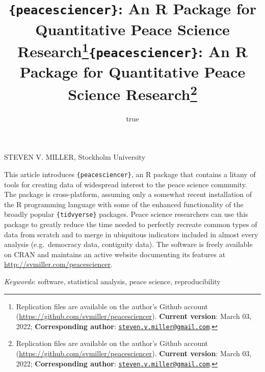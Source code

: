 \documentclass[
  11pt,
]{article}
\title{\texttt{\{peacesciencer\}}: An R Package for Quantitative Peace Science Research\thanks{Replication files are available on the author's Github account (\url{https://github.com/svmiller/peacesciencer}). \textbf{Current version}: March 03, 2022; \textbf{Corresponding author}: \href{mailto:steven.v.miller@gmail.com}{\nolinkurl{steven.v.miller@gmail.com}}.}}
\author{true}
\date{}
\title{\texttt{\{peacesciencer\}}: An R Package for Quantitative Peace Science Research\thanks{Replication files are available on the author's Github account (\url{https://github.com/svmiller/peacesciencer}). \textbf{Current version}: March 03, 2022; \textbf{Corresponding author}: \href{mailto:steven.v.miller@gmail.com}{\nolinkurl{steven.v.miller@gmail.com}}.}  }
\date{}
\renewenvironment{abstract}
 {{%
    \setlength{\leftmargin}{0mm}
    \setlength{\rightmargin}{\leftmargin}%
  }%
  \relax}
 {\endlist}
\begin{document}



{%
\setlength{\parindent}{0pt}
\thispagestyle{plain}
{%
\maketitle  %

}




{
   \vskip 13.5pt\relax \normalsize\fontsize{11}{12}
   \MakeUppercase{Steven V. Miller}, \small{Stockholm University}   

}

}








\begin{abstract}


    \vskip 8.5pt %

\noindent \small{This article introduces \texttt{\{peacesciencer\}}, an R package that contains a litany of tools for creating data of widespread interest to the peace science community. The package is cross-platform, assuming only a somewhat recent installation of the R programming language with some of the enhanced functionality of the broadly popular \texttt{\{tidvyerse\}} packages. Peace science researchers can use this package to greatly reduce the time needed to perfectly recreate common types of data from scratch and to merge in ubiquitous indicators included in almost every analysis (e.g.~democracy data, contiguity data). The software is freely available on CRAN and maintains an active website documenting its features at \url{http://svmiller.com/peacesciencer}.}


\vskip 8.5pt \noindent \emph{Keywords}: software, statistical analysis, peace science, reproducibility \par




\end{abstract}
\end{document}
